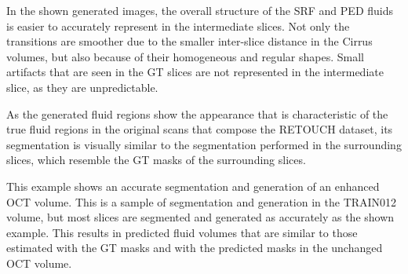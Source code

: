 In the shown generated images, the overall structure of the SRF and PED fluids is easier to accurately represent in the intermediate slices. Not only the transitions are smoother due to the smaller inter-slice distance in the Cirrus volumes, but also because of their homogeneous and regular shapes. Small artifacts that are seen in the GT slices are not represented in the intermediate slice, as they are unpredictable.
\par
As the generated fluid regions show the appearance that is characteristic of the true fluid regions in the original scans that compose the RETOUCH dataset, its segmentation is visually similar to the segmentation performed in the surrounding slices, which resemble the GT masks of the surrounding slices. 
\par
This example shows an accurate segmentation and generation of an enhanced OCT volume. This is a sample of segmentation and generation in the TRAIN012 volume, but most slices are segmented and generated as accurately as the shown example. This results in predicted fluid volumes that are similar to those estimated with the GT masks and with the predicted masks in the unchanged OCT volume.